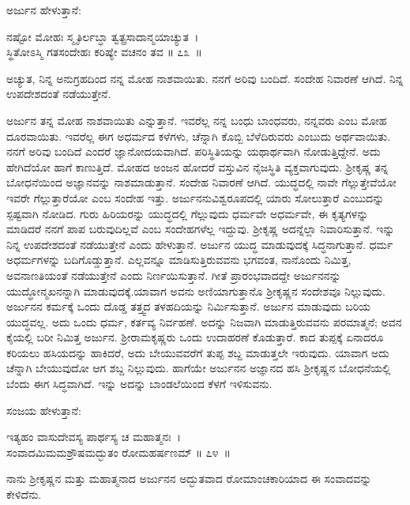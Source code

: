 ಅರ್ಜುನ ಹೇಳುತ್ತಾನೆ:

\begin{shloka}
ನಷ್ಟೋ ಮೋಹಃ ಸ್ಮೃತಿರ್ಲಬ್ಧಾ ತ್ವತ್ಪ್ರಸಾದಾನ್ಮಯಾಚ್ಯುತ~।\\ಸ್ಥಿತೋಽಸ್ಮಿ ಗತಸಂದೇಹಃ ಕರಿಷ್ಯೇ ವಚನಂ ತವ \hfill॥ ೭೩~॥
\end{shloka}

\begin{artha}
ಅಚ್ಯುತ, ನಿನ್ನ ಅನುಗ್ರಹದಿಂದ ನನ್ನ ಮೋಹ ನಾಶವಾಯಿತು. ನನಗೆ ಅರಿವು ಬಂದಿದೆ. ಸಂದೇಹ ನಿವಾರಣೆ ಆಗಿದೆ. ನಿನ್ನ ಉಪದೇಶದಂತೆ ನಡೆಯುತ್ತೇನೆ.
\end{artha}

ಅರ್ಜುನ ತನ್ನ ಮೋಹ ನಾಶವಾಯಿತು ಎನ್ನುತ್ತಾನೆ. ಇವರೆಲ್ಲ ನನ್ನ ಬಂಧು ಬಾಂಧವರು, ನನ್ನವರು ಎಂಬ ಮೋಹ ದೂರವಾಯಿತು. ಇವರೆಲ್ಲ ಈಗ ಅಧರ್ಮದ ಕಳೆಗಳು, ಚೆನ್ನಾಗಿ ಕೊಬ್ಬಿ ಬೆಳೆದಿರುವರು ಎಂಬುದು ಅರ್ಥವಾಯಿತು. ನನಗೆ ಅರಿವು ಬಂದಿದೆ ಎಂದರೆ ಜ್ಞಾನೋದಯವಾಗಿದೆ. ಪರಿಸ್ಥಿತಿಯನ್ನು ಯಥಾರ್ಥವಾಗಿ ನೋಡುತ್ತಿದ್ದೇನೆ. ಅದು ಹೇಗಿದೆಯೋ ಹಾಗೆ ಕಾಣುತ್ತಿದೆ. ಮೋಹದ ಅಂಜನ ಹೋದರೆ ವಸ್ತುವಿನ ನೈಜಸ್ಥಿತಿ ವ್ಯಕ್ತವಾಗುವುದು. ಶ‍್ರೀಕೃಷ್ಣ ತನ್ನ ಬೋಧನೆಯಿಂದ ಅಜ್ಞಾನವನ್ನು ನಾಶಮಾಡುತ್ತಾನೆ. ಸಂದೇಹ ನಿವಾರಣೆ ಆಗಿದೆ. ಯುದ್ಧದಲ್ಲಿ ನಾವೇ ಗೆಲ್ಲುತ್ತೇವೆಯೋ ಇವರೇ ಗೆಲ್ಲುತ್ತಾರೆಯೋ ಎಂಬ ಸಂದೇಹ ಇತ್ತು. ಅರ್ಜುನನು\break ವಿಶ್ವರೂಪದಲ್ಲಿ ಯಾರು ಸೋಲುತ್ತಾರೆ ಎಂಬುದನ್ನು ಸ್ಪಷ್ಟವಾಗಿ ನೋಡಿದ. ಗುರು ಹಿರಿಯರನ್ನು ಯುದ್ಧದಲ್ಲಿ ಗೆಲ್ಲುವುದು ಧರ್ಮವೇ ಅಧರ್ಮವೇ, ಈ ಕೃತ್ಯಗಳನ್ನು ಮಾಡಿದರೆ ನನಗೆ ಪಾಪ ಬರುವುದಿಲ್ಲವೆ ಎಂಬ ಸಂದೇಹಗಳೆಲ್ಲ ಇದ್ದುವು. ಶ‍್ರೀಕೃಷ್ಣ ಅದನ್ನೆಲ್ಲಾ ನಿವಾರಿಸುತ್ತಾನೆ. ಇನ್ನು ನಿನ್ನ ಉಪದೇಶದಂತೆ ನಡೆಯುತ್ತೇನೆ ಎಂದು ಹೇಳುತ್ತಾನೆ. ಅರ್ಜುನ ಯುದ್ಧ ಮಾಡುವುದಕ್ಕೆ ಸಿದ್ಧನಾಗುತ್ತಾನೆ. ಧರ್ಮ ಅಧರ್ಮಗಳನ್ನು ಬದಿಗೊಡ್ಡುತ್ತಾನೆ. ಎಲ್ಲವನ್ನೂ ಮಾಡಿಸುತ್ತಿರುವವನು ಭಗವಂತ, ನಾನೊಂದು ನಿಮಿತ್ತ, ಅವನಾಣತಿಯಂತೆ ನಡೆಯುತ್ತೇನೆ ಎಂದು ನಿರ್ಣಯಿಸುತ್ತಾನೆ. ಗೀತೆ ಪ್ರಾರಂಭವಾದದ್ದೇ ಅರ್ಜುನನನ್ನು ಯುದ್ಧೋನ್ಮಖನನ್ನಾಗಿ ಮಾಡುವುದಕ್ಕೆ.\break ಯಾವಾಗ ಅವನು ಅಣಿಯಾಗುತ್ತಾನೊ ಶ‍್ರೀಕೃಷ್ಣನ ಸಂದೇಶವೂ ನಿಲ್ಲುವುದು. ಅರ್ಜುನನ ಕರ್ಮಕ್ಕೆ ಒಂದು ದೊಡ್ಡ ತತ್ತ್ವದ ತಳಹದಿಯನ್ನು ನಿರ್ಮಿಸುತ್ತಾನೆ. ಅರ್ಜುನ ಮಾಡುವುದು ಬರಿಯ ಯುದ್ಧವಲ್ಲ. ಅದು ಒಂದು ಧರ್ಮ, ಕರ್ತವ್ಯ ನಿರ್ವಹಣೆ. ಅದನ್ನು ನಿಜವಾಗಿ ಮಾಡುತ್ತಿರುವವನು ಪರಮಾತ್ಮನೆ; ಅವನ ಕೈಯಲ್ಲಿ ಬರೀ ನಿಮಿತ್ತ ಅರ್ಜುನ. ಶ‍್ರೀರಾಮಕೃಷ್ಣರು ಒಂದು ಉದಾಹರಣೆ ಕೊಡುತ್ತಾರೆ. ಕಾದ ತುಪ್ಪಕ್ಕೆ ಏನಾದರೂ ಕರಿಯಲು ಹಸಿಯದನ್ನು ಹಾಕಿದರೆ, ಅದು ಬೇಯುವವರೆಗೆ ತುಪ್ಪ ಶಬ್ದ ಮಾಡುತ್ತಲೇ ಇರುವುದು. ಯಾವಾಗ ಅದು ಚೆನ್ನಾಗಿ ಬೇಯುವುದೋ ಆಗ ಶಬ್ದ ನಿಲ್ಲುವುದು. ಹಾಗೆಯೇ ಅರ್ಜುನನ ಅಜ್ಞಾನದ ಹಸಿ ಶ‍್ರೀಕೃಷ್ಣನ ಬೋಧನೆಯಲ್ಲಿ ಬೆಂದು ಈಗ ಸಿದ್ಧವಾಗಿದೆ. ಇನ್ನು ಅದನ್ನು ಬಾಂಡಲೆಯಿಂದ ಕೆಳಗೆ ಇಳಿಸುವನು.

ಸಂಜಯ ಹೇಳುತ್ತಾನೆ:

\begin{shloka}
ಇತ್ಯಹಂ ವಾಸುದೇವಸ್ಯ ಪಾರ್ಥಸ್ಯ ಚ ಮಹಾತ್ಮನಃ~।\\ಸಂವಾದಮಿಮಮಶ್ರೌಷಮದ್ಭುತಂ ರೋಮಹರ್ಷಣಮ್ \hfill॥ ೭೪~॥
\end{shloka}

\begin{artha}
ನಾನು ಶ‍್ರೀಕೃಷ್ಣನ ಮತ್ತು ಮಹಾತ್ಮನಾದ ಅರ್ಜುನನ ಅದ್ಭುತವಾದ ರೋಮಾಂಚಕಾರಿಯಾದ ಈ ಸಂವಾದವನ್ನು ಕೇಳಿದೆನು.
\end{artha}

